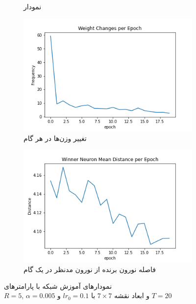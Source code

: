 \documentclass[12pt, a4paper]{article}
\begin{document}
\begin{figure}[h]
\begin{subfigure}{0.45\linewidth}
        \caption{نمودار }
    \end{subfigure}
    \newline
    \begin{subfigure}{0.45\linewidth}
        \includegraphics[width=\linewidth]{images/q5/r8/weight_change.png}
        \caption{تغییر وزن‌ها در هر گام}
    \end{subfigure}
    \hfill
    \begin{subfigure}{0.45\linewidth}
        \includegraphics[width=\linewidth]{images/q5/r8/winner_distance.png}
        \caption{فاصله نورون برنده از نورون مدنظر در یک گام}
    \end{subfigure}
    \caption{نمودار‌های آموزش شبکه  با پارامتر‌های \\$R=5$, $\alpha=0.005$ و ابعاد نقشه $7 \times 7$ با $lr_0=0.1$ و $T=20$}
    \label{r8}
\end{figure}
\end{document}
